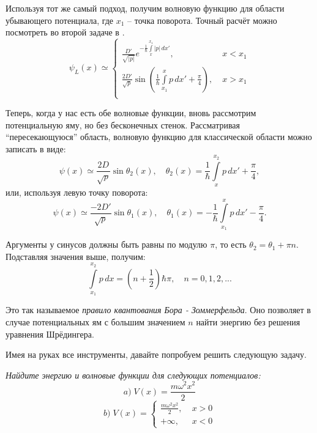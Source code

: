 Используя тот же самый подход, получим волновую функцию для области убывающего потенциала, где $x_1$ -- точка поворота. Точный расчёт можно посмотреть во второй задаче в .
\[
\psi_L(x) \simeq 
\begin{cases}
    \frac{D'}{\sqrt{|p|}}e^{-\frac{1}{\hbar} \int\limits_{x}^{x_1} |p|\,dx'},\; &x < x_1\\
    \frac{2D'}{\sqrt{p}}\sin\left( \frac{1}{\hbar} \int\limits_{x_1}^{x} p\,dx' + \frac{\pi}{4} \right), \; &x > x_1\\
\end{cases}
\]

Теперь, когда у нас есть обе волновые функции, вновь рассмотрим потенциальную яму, но без бесконечных стенок. Рассматривая ``пересекающуюся'' область, волновую функцию для классической области можно записать в виде:
\[
\psi(x) \simeq \frac{2D}{\sqrt{p}}\sin\theta_2(x),\quad \theta_2(x) = \frac{1}{\hbar}\int\limits_{x}^{x_2}p\,dx' + \frac{\pi}{4},
\]
или, используя левую точку поворота:
\[
\psi(x) \simeq \frac{-2D'}{\sqrt{p}}\sin\theta_1(x),\quad \theta_1(x) = -\frac{1}{\hbar}\int\limits_{x_1}^{x}p\,dx' - \frac{\pi}{4}.
\]

Аргументы у синусов должны быть равны по модулю $\pi$, то есть $\theta_2 = \theta_1 + \pi n$. Подставляя значения выше, получим:
\[
\int\limits_{x_1}^{x_2}p\, dx = (n + \frac{1}{2})\hbar\pi,\quad n = 0, 1, 2, ...
\]

Это так называемое \textit{правило квантования Бора - Зоммерфельда}. Оно позволяет в случае потенциальных ям с большим значением $n$ найти энергию без решения уравнения Шрёдингера. 

Имея на руках все инструменты, давайте попробуем решить следующую задачу.

\newpage
{}
\begin{center}
    \textit{Найдите энергию и волновые функции для следующих потенциалов:}
    \[
    a)\;V(x) = \frac{m\omega^2 x^2}{2}
    \]
    \[
    b)\;V(x) = 
    \begin{cases}
     \frac{m\omega^2 x^2}{2},\;&x > 0\\
    +\infty,\; &x < 0
    \end{cases}
    \]
\end{center}

